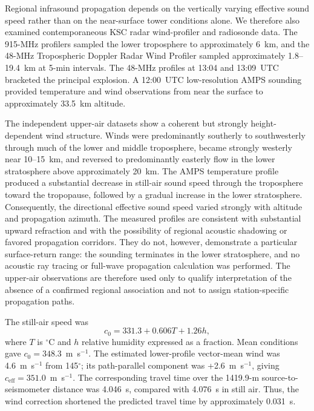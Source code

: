 \documentclass[]{seismica}
\begin{document}
Regional infrasound propagation depends on the vertically varying effective
sound speed rather than on the near-surface tower conditions alone. We therefore
also examined contemporaneous KSC radar wind-profiler and radiosonde data. The
915-MHz profilers sampled the lower troposphere to approximately 6~km, and the
48-MHz Tropospheric Doppler Radar Wind Profiler sampled approximately
1.8--19.4~km at 5-min intervals. The 48-MHz profiles at 13:04 and 13:09~UTC
bracketed the principal explosion. A 12:00~UTC low-resolution AMPS sounding
provided temperature and wind observations from near the surface to
approximately 33.5~km altitude.

The independent upper-air datasets show a coherent but strongly
height-dependent wind structure. Winds were predominantly southerly to
southwesterly through much of the lower and middle troposphere, became strongly
westerly near 10--15~km, and reversed to predominantly easterly flow in the
lower stratosphere above approximately 20~km. The AMPS temperature profile
produced a substantial decrease in still-air sound speed through the
troposphere toward the tropopause, followed by a gradual increase in the lower
stratosphere. Consequently, the directional effective sound speed varied
strongly with altitude and propagation azimuth. The measured profiles are
consistent with substantial upward refraction and with the possibility of
regional acoustic shadowing or favored propagation corridors. They do not,
however, demonstrate a particular surface-return range: the sounding terminates
in the lower stratosphere, and no acoustic ray tracing or full-wave propagation
calculation was performed. The upper-air observations are therefore used only
to qualify interpretation of the absence of a confirmed regional association and not to assign
station-specific propagation paths.

The still-air speed was
\begin{equation}
 c_0=331.3+0.606T+1.26h,
\end{equation}
where $T$ is $^\circ$C and $h$ relative humidity expressed as a fraction. Mean
conditions gave $c_0=348.3$~m~s$^{-1}$. The estimated lower-profile
vector-mean wind was 4.6~m~s$^{-1}$ from 145$^\circ$; its path-parallel
component was +2.6~m~s$^{-1}$, giving
$c_{\mathrm{eff}}=351.0$~m~s$^{-1}$. The corresponding travel time over
the 1419.9-m source-to-seismometer distance was 4.046~s, compared with 4.076~s in still air. Thus, the wind
correction shortened the predicted travel time by approximately 0.031~s.
\end{document}
